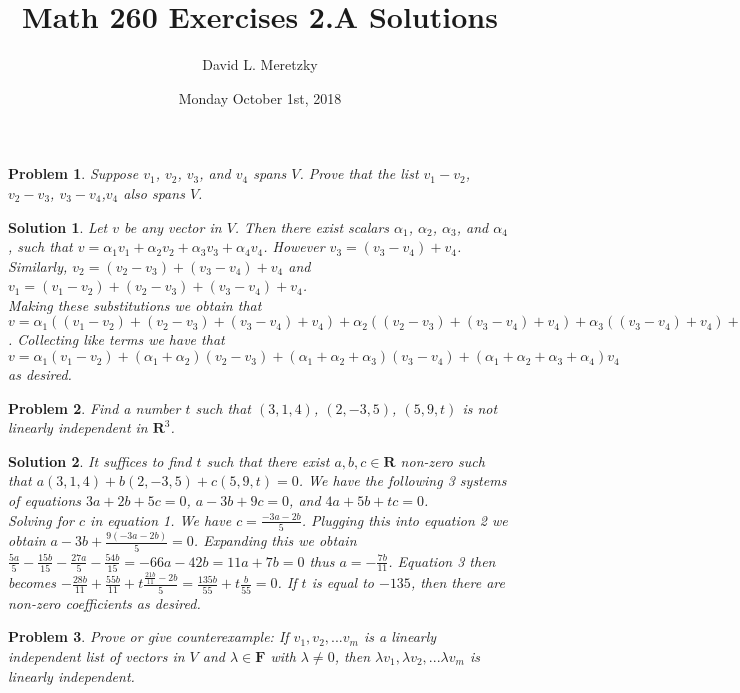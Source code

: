 \documentclass{article}
\title{ \vspace{-10ex} %
Math 260 Exercises 2.A Solutions
}
\author{David L. Meretzky
}
\date{%
Monday October 1st, 2018
}
\theoremstyle{problemstyle}
\newtheorem{problem}{Problem}
\theoremstyle{problemstyle}
\newtheorem{solution}{Solution}
\begin{document}
\maketitle

\begin{problem}
Suppose $v_1$, $v_2$, $v_3$, and $v_4$ spans $V$. Prove that the list $v_1-v_2$, $v_2-v_3$, $v_3-v_4$,$v_4$ also spans $V$. 
\end{problem}

\begin{solution}
Let $v$ be any vector in $V$. Then there exist scalars $\alpha_1$, $\alpha_2$, $\alpha_3$, and $\alpha_4$, such that $v = \alpha_1v_1 + \alpha_2v_2 +\alpha_3v_3 +\alpha_4v_4$. However $v_3 = (v_3-v_4)+v_4$. Similarly, $v_2 = (v_2-v_3)+(v_3-v_4)+v_4$ and $v_1 = (v_1-v_2)+(v_2-v_3)+(v_3-v_4)+v_4$.\\ 

Making these substitutions we obtain that $v = \alpha_1((v_1-v_2)+(v_2-v_3)+(v_3-v_4)+v_4) + \alpha_2((v_2-v_3)+(v_3-v_4)+v_4) +\alpha_3((v_3-v_4)+v_4) +\alpha_4v_4$. Collecting like terms we have that $v = \alpha_1(v_1-v_2)+(\alpha_1+\alpha_2)(v_2-v_3)+(\alpha_1+\alpha_2+\alpha_3)(v_3-v_4)+(\alpha_1+\alpha_2+\alpha_3+\alpha_4)v_4$ as desired.
\end{solution}

\begin{problem}
Find a number $t$ such that $(3,1,4)$, $(2,-3,5)$, $(5,9,t)$ is not linearly independent in $\textbf{R}^3$.
\end{problem}

\begin{solution}
It suffices to find $t$ such that there exist $a,b,c \in \textbf{R}$ non-zero such that $a(3,1,4)+b(2,-3,5)+c(5,9,t)=0$. We have the following 3 systems of equations $3a+2b+5c=0$, $a-3b+9c=0$, and $4a+5b+tc=0$.\\ 

Solving for $c$ in equation 1. We have $c = \frac{-3a-2b}{5}$.  Plugging this into equation 2 we obtain $a-3b+\frac{9(-3a-2b)}{5}=0$. Expanding this we obtain $\frac{5a}{5}-\frac{15b}{15}-\frac{27a}{5}-\frac{54b}{15} = -66a-42b = 11a+7b = 0$ thus $a = -\frac{7b}{11}$. Equation 3 then becomes $-\frac{28b}{11}+\frac{55b}{11}+t\frac{\frac{21b}{11}-2b}{5} = \frac{135b}{55}+t\frac{b}{55} = 0$. If $t$ is equal to $-135$, then there are non-zero coefficients as desired. 
\end{solution}

\begin{problem}
Prove or give counterexample: If $v_1, v_2, ... v_m$ is a linearly independent list of vectors in $V$ and $\lambda \in \textbf{F}$ with $\lambda \neq 0$, then $\lambda v_1, \lambda v_2, ... \lambda v_m$ is linearly independent. 
\end{problem}
\end{document}
